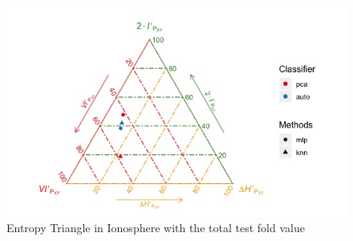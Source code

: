 \documentclass[12pt]{report}
\begin{document}
\begin{figure}[H]
	\centering
	\includegraphics[width=1\linewidth]{Figuras_tfg/ET_Total_Ionosphere}
	\caption{Entropy Triangle in Ionosphere with the total test fold value}
	\label{fig:figure_Total_Ionosphere_ET}
\end{figure}


























\clearpage
{}

\printbibliography




\end{document}
